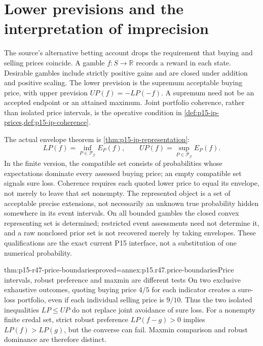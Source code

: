 \section{Lower previsions and the interpretation of imprecision}
\label{sec:p15-r47-lower-previsions}

The source's alternative betting account drops the requirement that buying
and selling prices coincide. A gamble \(f:S\to\mathbb R\) records a reward
in each state. Desirable gambles include strictly positive gains and are
closed under addition and positive scaling. The lower prevision is the
supremum acceptable buying price, with upper prevision
\(UP(f)=-LP(-f)\). A supremum need not be an accepted endpoint or an attained
maximum. Joint portfolio coherence, rather than isolated price intervals,
is the operative condition in \cref{def:p15-ip-prices,def:p15-ip-coherence}.

The actual envelope theorem is \cref{thm:p15-ip-representation}:
\[
 LP(f)=\inf_{P\in\mathcal P_{\mathcal G}}E_P(f),\qquad
 UP(f)=\sup_{P\in\mathcal P_{\mathcal G}}E_P(f).
\]
In the finite version, the compatible set consists of probabilities whose
expectations dominate every assessed buying price; an empty compatible set
signals sure loss. Coherence requires each quoted lower price to equal its
envelope, not merely to leave that set nonempty. The represented object is
a set of acceptable precise extensions, not necessarily an unknown true
probability hidden somewhere in its event intervals. On all bounded gambles
the closed convex representing set is determined; restricted event
assessments need not determine it, and a raw nonclosed prior set is not
recovered merely by taking envelopes. These qualifications are the exact
current P15 interface, not a substitution of one numerical probability.

\begin{hblemma}{thm:p15-r47-price-boundaries}{proved=annex:p15.r47.price-boundaries}{Price intervals, robust preference and maxmin are different tests}
On two exclusive exhaustive outcomes, quoting buying price \(4/5\) for
each indicator creates a sure-loss portfolio, even if each individual
selling price is \(9/10\). Thus the two isolated inequalities
\(LP\leq UP\) do not replace joint avoidance of sure loss.
For a nonempty finite credal set, strict robust preference
\(LP(f-g)>0\) implies \(LP(f)>LP(g)\), but the converse can fail.
Maxmin comparison and robust dominance are therefore distinct.
\end{hblemma}

